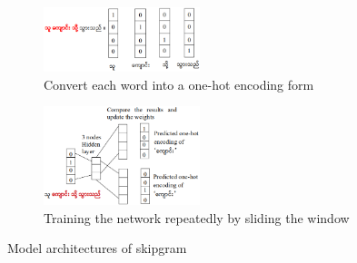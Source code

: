 \documentclass[conference]{IEEEtran}
\begin{document}
\begin{figure}
     \centering
     \begin{subfigure}[b]{0.5\textwidth}
         \centering
         \includegraphics[width=0.5\textwidth]{./fig/cbow-skip-a.png}
  	 \caption{Convert each word into a one-hot encoding form}
         \label{fig:cbowskipAfig}
     \end{subfigure}
     \hfill
     \begin{subfigure}[b]{0.5\textwidth}
         \centering
         \includegraphics[width=0.5\textwidth]{./fig/skip-gram-b.png}
 	 \caption{Training the network repeatedly by sliding the window} 
	 \label{fig:skipBfig}
     \end{subfigure}
        \caption{Model architectures of skipgram}
        \label{fig:skip}
\end{figure}
\end{document}
